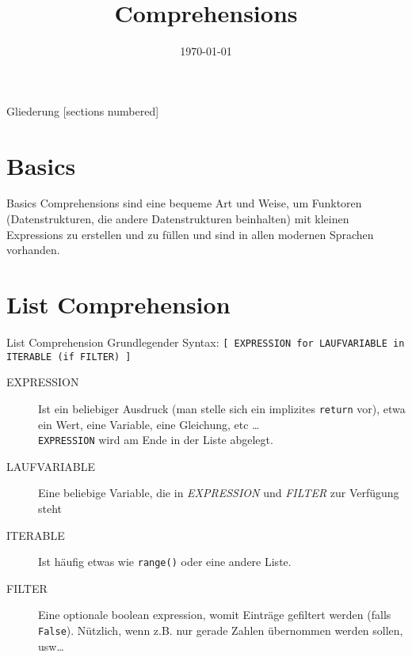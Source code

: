 



\title{Comprehensions}
\date{\today}




\maketitle

\begin{frame}{Gliederung}
	[sections numbered]
	\tableofcontents
\end{frame}


\section{Basics}
\begin{frame}{Basics}
  Comprehensions sind eine bequeme Art und Weise, um Funktoren (Datenstrukturen, die andere Datenstrukturen beinhalten) mit kleinen Expressions zu erstellen und zu füllen und sind in allen modernen Sprachen vorhanden.
\end{frame}



\section{List Comprehension}
\begin{frame}{List Comprehension}
  Grundlegender Syntax: \alert{\texttt{[ EXPRESSION for LAUFVARIABLE in ITERABLE (if FILTER) ]}}\\
  \begin{description}
    \item[EXPRESSION] Ist ein beliebiger Ausdruck (man stelle sich ein implizites \texttt{return} vor), etwa ein Wert, eine Variable, eine Gleichung, etc \ldots \\
    	\texttt{EXPRESSION} wird am Ende in der Liste abgelegt.
    \item[LAUFVARIABLE] Eine beliebige Variable, die in \textit{EXPRESSION} und \textit{FILTER} zur Verfügung steht
    \item[ITERABLE] Ist häufig etwas wie \texttt{range()} oder eine andere Liste.
    \item[FILTER] Eine optionale boolean expression, womit Einträge gefiltert werden (falls \texttt{False}). N\"utzlich, wenn z.B. nur gerade Zahlen \"ubernommen werden sollen, usw\ldots
  \end{description}

\end{frame}


